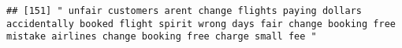 \documentclass[
]{article}
\begin{document}
\begin{verbatim}
## [151] " unfair customers arent change flights paying dollars accidentally booked flight spirit wrong days fair change booking free mistake airlines change booking free charge small fee "                                                                                                                                                                                                                                                                                                                                                                                                                                                                                                                                                                                                                                                                                                                                                                                                                                                                                                                                                                                                                                                                                                                                                                                                                                                                                                                                                                                                                                                                                                                                                                                                            

\end{verbatim}
\end{document}
